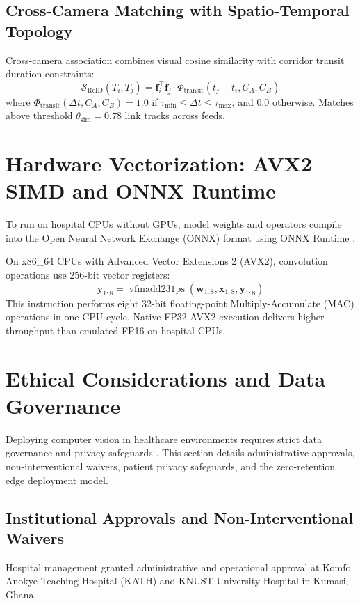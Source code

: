 \subsection{Cross-Camera Matching with Spatio-Temporal Topology}
Cross-camera association combines visual cosine similarity with corridor transit duration constraints:
\begin{equation}
    \mathcal{S}_{\text{ReID}}(T_i, T_j) = \mathbf{f}_i^{\top} \mathbf{f}_j \cdot \Phi_{\text{transit}}(t_j - t_i, C_A, C_B)
\end{equation}
where $\Phi_{\text{transit}}(\Delta t, C_A, C_B) = 1.0$ if $\tau_{\min} \le \Delta t \le \tau_{\max}$, and $0.0$ otherwise. Matches above threshold $\theta_{\text{sim}} = 0.78$ link tracks across feeds.

\section{Hardware Vectorization: AVX2 SIMD and ONNX Runtime}
To run on hospital CPUs without GPUs, model weights and operators compile into the Open Neural Network Exchange (ONNX) format using ONNX Runtime \cite{onnxruntime2021}.

On x86\_64 CPUs with Advanced Vector Extensions 2 (AVX2), convolution operations use 256-bit vector registers:
\begin{equation}
    \mathbf{y}_{1:8} = \operatorname{vfmadd231ps}(\mathbf{w}_{1:8}, \mathbf{x}_{1:8}, \mathbf{y}_{1:8})
\end{equation}
This instruction performs eight 32-bit floating-point Multiply-Accumulate (MAC) operations in one CPU cycle. Native FP32 AVX2 execution delivers higher throughput than emulated FP16 on hospital CPUs.

\section{Ethical Considerations and Data Governance}
Deploying computer vision in healthcare environments requires strict data governance and privacy safeguards \cite{milkaite2019, javaid2024}. This section details administrative approvals, non-interventional waivers, patient privacy safeguards, and the zero-retention edge deployment model.

\subsection{Institutional Approvals and Non-Interventional Waivers}
Hospital management granted administrative and operational approval at Komfo Anokye Teaching Hospital (KATH) and KNUST University Hospital in Kumasi, Ghana.

